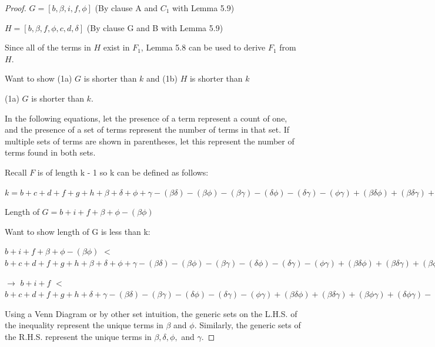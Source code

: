 \documentclass[manuscript]{acmart}
\begin{document}
\begin{proof}
        $G = [b, \beta, i, f, \phi]$ (By clause A and $C_1$ with Lemma 5.9)

        $H = [b, \beta, f, \phi, c, d, \delta]$ (By clause G and B with Lemma 5.9)

        Since all of the terms in $H$ exist in $F_1$, Lemma 5.8 can be used to
        derive $F_1$ from $H$.

        Want to show (1a) $G$ is shorter than $k$ and (1b) $H$ is shorter than $k$

        (1a) $G$ is shorter than $k$.

        In the following equations, let the presence of a term represent a count of one,
        and the presence of a set of terms represent the number of terms in that set. If
        multiple sets of terms are shown in parentheses, let this represent the number
        of terms found in both sets.
        
        Recall $F$ is of length k - 1 so k can be defined as follows:
        
        $k = b + c + d + f + g + h 
        + \beta + \delta + \phi + \gamma
        - (\beta \delta) - (\beta \phi) - (\beta \gamma) - (\delta \phi) - (\delta \gamma) - (\phi \gamma)
        + (\beta \delta \phi) + (\beta \delta \gamma) + (\beta \phi \gamma) + (\delta \phi \gamma)
        - (\beta \delta \phi \gamma)
        + 1
        $

        Length of $G = b + i + f + \beta + \phi - (\beta \phi)$

        Want to show length of G is less than k:

        $b + i + f + \beta + \phi - (\beta \phi)$
        $<$
        $b + c + d + f + g + h 
        + \beta + \delta + \phi + \gamma
        - (\beta \delta) - (\beta \phi) - (\beta \gamma) - (\delta \phi) - (\delta \gamma) - (\phi \gamma)
        + (\beta \delta \phi) + (\beta \delta \gamma) + (\beta \phi \gamma) + (\delta \phi \gamma)
        - (\beta \delta \phi \gamma) 
        + 1
        $

        $\rightarrow$ $b + i + f$
        $<$
        $b + c + d + f + g + h 
         + \delta + \gamma
        - (\beta \delta) - (\beta \gamma) - (\delta \phi) - (\delta \gamma) - (\phi \gamma)
        + (\beta \delta \phi) + (\beta \delta \gamma) + (\beta \phi \gamma) + (\delta \phi \gamma)
        - (\beta \delta \phi \gamma) 
        + 1
        $

        Using a Venn Diagram or by other set intuition, the generic sets on the
        L.H.S. of the inequality represent the unique terms in $\beta$ and $\phi$.
        Similarly, the generic sets of the R.H.S. represent the unique terms
        in $\beta, \delta, \phi,$ and $\gamma$. 


\end{proof}
\end{document}
